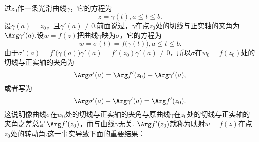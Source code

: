 过$z_0$作一条光滑曲线$\gamma$，它的方程为
\[z=\gamma(t),a\le t\le b.\]
设$\gamma(a)=z_0$，且$\gamma'(a)\ne0$.前面说过，$\gamma$在点$z_0$处的切线与正实轴的夹角为$\Arg\gamma'(a)$.设$w=f(z)$把曲线$\gamma$映为$\sigma$，它的方程为\[w=\sigma(t)=f\big(\gamma(t)\big),a\le t\le b.\]
由于$\sigma'(a)=f'\big(\gamma(a)\big)\gamma'(a)=f'(z_0)\gamma'(a)\ne0$，所以$\sigma$在$w_0=f(z_0)$处的切线与正实轴的夹角为
\[\Arg\sigma'(a)=\Arg f'(z_0)+\Arg \gamma'(a),\]
或者写为
\begin{equation}\label{eq2.3.1}
\Arg\sigma'(a)-\Arg \gamma'(a)=\Arg f'(z_0).
\end{equation}
这说明像曲线$\sigma$在$w_0$处的切线与正实轴的夹角与原曲线$\gamma$在$z_0$处的切线与正实轴的夹角之差总是$\Arg f'(z_0)$，而与曲线$\gamma$无关.
$\Arg f'(z_0)$就称为映射$w=f(z)$在点$z_0$处的转动角.这一事实导致下面的重要结果：


